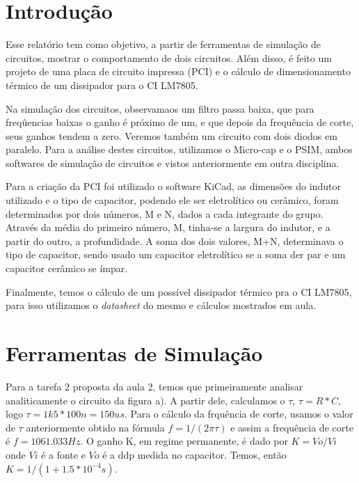 \chapter*{Introdução}

Esse relatório tem como objetivo, a partir de ferramentas de simulação de circuitos, mostrar o comportamento de dois circuitos. Além disso, é feito um projeto de uma placa de circuito impressa (PCI) e o cálculo de dimensionamento térmico de um dissipador para o CI LM7805. 

Na simulação dos circuitos, observamaos um filtro passa baixa, que para freqûencias baixas o ganho é próximo de um, e que depois da frequência de corte, seus ganhos tendem a zero. Veremos também um circuito com dois diodos em paralelo. Para a análise destes circuitos, utilizamos o Micro-cap e o PSIM, ambos softwares de simulação de circuitos e vistos anteriormente em outra disciplina.

Para a criação da PCI foi utilizado o software KiCad, as dimensões do indutor utilizado e o tipo de capacitor, podendo ele ser eletrolítico ou cerâmico, foram determinados por dois números, M e N, dados a cada integrante do grupo. Através da média do primeiro número, M, tinha-se a largura do indutor, e a partir do outro, a profundidade. A soma dos dois valores, M+N, determinava o tipo de capacitor, sendo usado um capacitor eletrolítico se a soma der par e um capacitor cerâmico se ímpar.

Finalmente, temos o cálculo de um possível dissipador térmico pra o CI LM7805, para isso utilizamos o \textit{datasheet} do mesmo e cálculos mostrados em aula. 

\chapter{Ferramentas de Simulação}\label{cap_simul}
    Para a tarefa 2 proposta da aula 2, temos que primeiramente analisar analiticamente o circuito da figura a). A partir dele, calculamos o $\tau$, $\tau = R*C $, logo $\tau = 1k5 * 100n = 150us$. Para o cálculo da frquência de corte, usamos o valor de $\tau$ anteriormente obtido na fórmula $f = 1/(2\pi\tau)$ e assim a frequência de corte é $f = 1061.033 Hz$. O ganho K, em regime permanente, é dado por $K = Vo/Vi$ onde $Vi$ é a fonte e $Vo$ é a ddp medida no capacitor. Temos, então $K = 1/(1 + 1.5*10^{-4}s)$.
    
